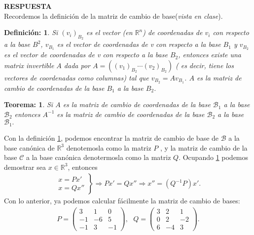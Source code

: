 \documentclass[11pt,letterpaper]{article}
\newcommand{\mR}{\mathbb{R}}
\newcommand{\res}{\textbf{RESPUESTA}\\}
\newtheorem{thmt}{Teorema:}
\newtheorem{thmd}{Definición:}
\begin{document}
\begin{enumerate}
\res Recordemos la definición de la matriz de cambio de base(\textit{vista en clase}).
\begin{framed}
    \begin{thmd} \label{matriz_base}
	Si $(v_i)_{B_2}$ es el vector (en $\mR^n$) de coordenadas de $v_i$ con respecto a la base $B^2$, $v_{B_1}$ es el vector de coordenadas de v con respecto a la base $B_1$ y $v_{B_2}$ es el vector de coordenadas de v con respecto a la base $B_2$, entonces existe una matrix invertible $A$ dada por $A = ((v_1 )_{B_2} \cdots (v_2)_{B_2} )$ ( es decir, tiene los vectores de coordenadas como columnas) tal que $v_{B_2} = Av_{B_1}$.
	$A$ es la matriz de cambio de coordenadas de la base $B_1$ a la base $B_2$.
    \end{thmd}
\end{framed}
\begin{framed}
    \begin{thmt} \label{matriz_base_inversa}
	Si $A$ es la matriz de cambio de coordenadas de la base $\mathcal{B}_1$ a la base $\mathcal{B}_2$ entonces $A^{-1}$ es la matriz de cambio de coordenadas de la base $\mathcal{B}_2$ a la base $\mathcal{B}_1.$
    \end{thmt}
\end{framed}
Con la definición \ref{matriz_base}, podemos encontrar la matriz de cambio de base de $\mathcal{B}$ a la base canónica de $\mR^3$ denotemosla como la matriz $P$ , y la matriz de cambio de la base $\mathcal{C}$ a la base canónica denotermosla como la matriz $Q$. Ocupando \ref{matriz_base_inversa} podemos demostrar sea $x\in\mR^3$, entonces
\begin{align*}
\left.\begin{array}{cc}
x=Px'\\
x=Qx''
\end{array}\right\}\Rightarrow Px'=Qx''\Rightarrow x''=(Q^{-1}P)x'.
\end{align*}
Con lo anterior, ya podemos calcular fácilmente la matriz de cambio de bases:
\begin{align*}
P=\begin{pmatrix}
 3 & 1 & 0\\
-1 &-6 & 5\\
-1 & 3 & -1
\end{pmatrix}, \ \ \ Q=\begin{pmatrix}
 3& 2 & 1\\
 0& 2 &-2\\
 6&-4 & 3
\end{pmatrix}.
\end{align*}

\end{enumerate}
\end{document}
